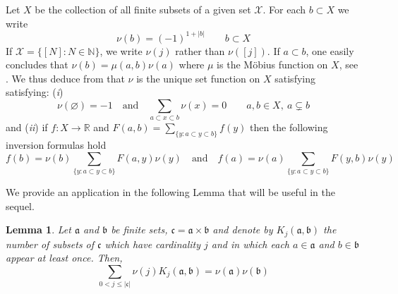 \documentclass[11pt]{amsart}
\theoremstyle{plain}
\newtheorem{lemma}{Lemma}
\begin{document}
Let $X$ be the collection of all finite subsets of a given set $\mathcal X$. For each $b\subset X$  
we write
\begin{equation}
\label{nu}
\nu(b)=(-1)^{1+{\vert b\vert}}\qquad b\subset X
\end{equation}
If $\mathcal X=\{[N]:N\in{\mathbb{N}}\}$, we write $\nu(j)$ rather than $\nu([j])$.
If $a\subset b$, one easily concludes that $\nu(b)=\mu(a,b)\nu(a)$ where $\mu$ is the 
M\"{o}bius function on $X$, see \cite[Corollary, p. 345]{rota}. We thus 
deduce from \cite[Propositions 1 and 2, p. 344]{rota} that $\nu$ is the unique set 
function on $X$ satisfying satisfying: (\textit{i}) 
\begin{equation}
\label{Mobius function}
\nu({\varnothing})=-1\quad\text{and}\quad\sum_{a\subset x\subset b}\nu(x)=0
\qquad a,b\in X,\ a\subsetneq b
\end{equation}
and (\textit{ii}) if $f:X\to{\mathbb{R}}$ and $F(a,b)=\sum_{\{y:a\subset y\subset b\}}f(y)$ 
then the following inversion formulas hold
\begin{equation}
\label{Mobius inversion}
f(b)=\nu(b)\sum_{\{y:a\subset y\subset b\}}F(a,y)\nu(y)\quad \text{and}\quad
f(a)=\nu(a)\sum_{\{y:a\subset y\subset b\}}F(y,b)\nu(y)
\end{equation}

We provide an application in the following Lemma that will be useful in the sequel.

\begin{lemma}
\label{lemma combinatorial} 
Let ${\mathfrak a}$ and ${\mathfrak b}$ be finite sets, ${\mathfrak c}={\mathfrak a}\times{\mathfrak b}$ and denote by $K_j({\mathfrak a},{\mathfrak b})$ 
the number of subsets of ${\mathfrak c}$ which have cardinality $j$ and in which each $a\in{\mathfrak a}$ 
and $b\in{\mathfrak b}$ appear at least once. Then,
\begin{equation} 
\label{K}
\sum_{0<j\le{\vert {\mathfrak c}\vert}}\nu(j)K_j({\mathfrak a},{\mathfrak b})=\nu({\mathfrak a})\nu({\mathfrak b})
\end{equation}
\end{lemma}
\end{document}
